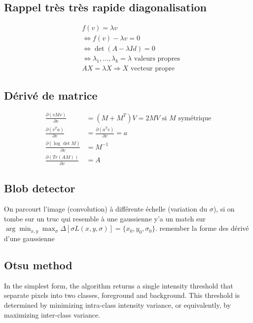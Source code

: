 \documentclass{article}
\theoremstyle{plain}%
\theoremstyle{definition}
\theoremstyle{remark}
\begin{document}
\subsection{Rappel très très rapide diagonalisation}
\begin{align*}
    &f(v) = \lambda v \\
    & \Leftrightarrow f(v) - \lambda v = 0 \\
    & \Leftrightarrow \det (A - \lambda Id) = 0 \\
    & \Leftrightarrow \lambda _1 ,\dots, \lambda _k = \lambda \text{ valeurs propres} \\
    & AX = \lambda X \Rightarrow X \text{ vecteur propre }
\end{align*}

\subsection{Dérivé de matrice}
\begin{align*}
    \frac{\partial (vMv)}{\partial v} &= (M + M^T)V = 2MV \text{ si } M \text{ symétrique} \\
    \frac{\partial (v^T a)}{\partial v} &= \frac{\partial (a^T v)}{\partial v} = a \\
    \frac{\partial (\log_{} \det M)}{\partial v} &= M^{-1}\\
    \frac{\partial (Tr(AM))}{\partial v} &= A
\end{align*}

\subsection{Blob detector}
On parcourt l'image (convolution) à différente échelle (variation du $ \sigma  $), si on tombe sur un truc qui resemble à une gaussienne y'a un match sur $ \arg \min _{x,y} \max _\sigma \Delta [\sigma L(x,y,\sigma )] = \{x_0, y_0, \sigma _0\} $. remember la forme des dérivé d'une gaussienne

\subsection{Otsu method}
In the simplest form, the algorithm returns a single intensity threshold that separate pixels into two classes, foreground and background. This threshold is determined by minimizing intra-class intensity variance, or equivalently, by maximizing inter-class variance.
\end{document}
